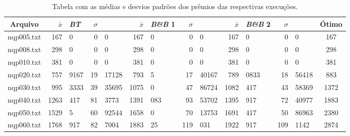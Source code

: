 \documentclass[12pt]{article}
\begin{document}
		\begin{table}[H]
			\centering
			\caption{Tabela com as médias e desvios padrões dos prêmios das respectivas execuções.} \label{tab:resul}
			{ \scriptsize

				\begin{tabular}{c||r@{.}lr@{.}l|r@{.}lr@{.}l|r@{.}lr@{.}l||c}
					\hline
					\textbf{Arquivo}    & $ \bar{x} $ & \textit{\textbf{BT}}   & $\sigma$ &                & $ \bar{x} $ & \textbf{\textit{B\&B} 1}      & $\sigma$  &                 & $ \bar{x} $ & \textbf{\textit{B\&B} 2}  & $\sigma$  &              & \textbf{Ótimo} \\ \hline
					nqp005.txt & 167         & 0             &  0       & 0              & 167         & 0                    &  0        & 0               & 167  & 0                       &  0        & 0            & 167          \\
					nqp008.txt & 298         & 0             &  0       & 0              & 298         & 0                    &  0        & 0               & 298  & 0                       &  0        & 0            & 298          \\
					nqp010.txt & 381         & 0             &  0       & 0              & 381         & 0                    &  0        & 0               & 381  & 0                       &  0        & 0            & 381          \\
					nqp020.txt & 757         & 9167          &  19      & 17128          & 793         & 5                    &  17       & 40167           & 789 & 0833                    &  18       & 56418        & 883          \\
					nqp030.txt & 995         & 3333          &  39      & 35695          & 1075        & 0                    &  47       & 86724           & 1082 & 417                     &  43       & 58369        & 1372         \\
					nqp040.txt & 1263        & 417           &  81      & 3773           & 1391        & 083                  &  93       & 53702           & 1395 & 917                     &  72       & 40977        & 1883         \\
					nqp050.txt & 1529        & 5             &  60      & 92544          & 1658        & 0                    &  70       & 13753           & 1691 & 417                     &  50       & 86963        & 2380         \\
					nqp060.txt & 1768        & 917           &  82      & 7004           & 1883        & 25                   &  119      & 031             & 1922 & 917                     &  109      & 1142         & 2874         \\

\end{tabular}}
\end{table}
\end{document}
